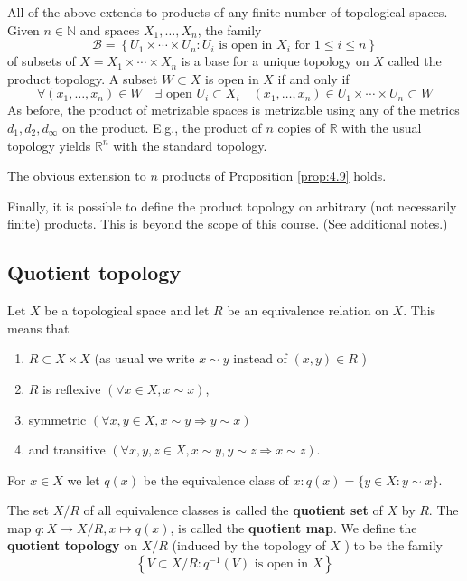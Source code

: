\documentclass[a4paper]{article}
\begin{document}
\begin{remark}
    All of the above extends to products of any finite number of topological spaces. Given $n \in \mathbb{N}$ and spaces $X_{1}, \ldots, X_{n}$, the family
    $$
    \mathcal{B}=\left\{U_{1} \times \cdots \times U_{n}: U_{i} \text { is open in } X_{i} \text { for } 1 \leqslant i \leqslant n\right\}
    $$
    of subsets of $X=X_{1} \times \cdots \times X_{n}$ is a base for a unique topology on $X$ called the product topology. A subset $W \subset X$ is open in $X$ if and only if
    $$
    \forall\left(x_{1}, \ldots, x_{n}\right) \in W \quad \exists \text { open } U_{i} \subset X_{i} \quad\left(x_{1}, \ldots, x_{n}\right) \in U_{1} \times \cdots \times U_{n} \subset W
    $$
    As before, the product of metrizable spaces is metrizable using any of the metrics $d_{1}, d_{2}, d_{\infty}$ on the product. E.g., the product of $n$ copies of $\mathbb{R}$ with the usual topology yields $\mathbb{R}^{n}$ with the standard topology.

    The obvious extension to $n$ products of Proposition \ref{prop:4.9} holds.

    Finally, it is possible to define the product topology on arbitrary (not necessarily finite) products. This is beyond the scope of this course. (See \href{https://www.dpmms.cam.ac.uk/~az10000/2021-mich-partib-aandt-product-topology.pdf}{additional notes}.)
\end{remark}

\subsection{Quotient topology}
Let $X$ be a topological space and let $R$ be an equivalence relation on $X$. This means that 
\begin{enumerate}
    \item $R \subset X \times X$ (as usual we write $x \sim y$ instead of $(x, y) \in R$ )
    \item $R$ is reflexive $(\forall x \in X, x \sim x)$,
    \item symmetric $(\forall x, y \in X, x \sim y \Rightarrow y \sim x)$ 
    \item and transitive $(\forall x, y, z \in X, x \sim y, y \sim z \Rightarrow x \sim z)$.
\end{enumerate}
For $x \in X$ we let $q(x)$ be the equivalence class of $x: q(x)=\{y \in X: y \sim x\}$.

\begin{definition}
    The set $X / R$ of all equivalence classes is called the \textbf{quotient set} of $X$ by $R$. The map $q: X \rightarrow X / R, x \mapsto q(x)$, is called the \textbf{quotient map}. We define the \textbf{quotient topology} on $X / R$ (induced by the topology of $X$ ) to be the family
    $$
    \left\{V \subset X / R: q^{-1}(V) \text { is open in } X\right\}
    $$
\end{definition}
\end{document}
